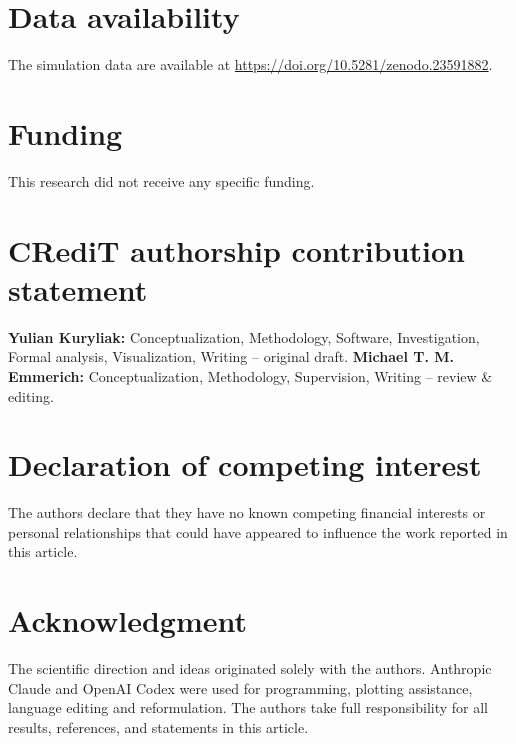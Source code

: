\documentclass{ieeeaccess}
\newcommand{\michael}[2]{{\color{RoyalBlue}#1}}
\begin{document}
\section*{Data availability}
\michael{The simulation data are available at
\url{https://doi.org/10.5281/zenodo.23591882}.}{The data is available at
\url{10.5281/zenodo.23591882}.}

\section*{Funding}
This research did not receive any specific funding.

\section*{CRediT authorship contribution statement}

\textbf{Yulian Kuryliak:} Conceptualization, Methodology, Software,
Investigation, Formal analysis, Visualization, Writing -- original draft.
\textbf{Michael T. M. Emmerich:} Conceptualization, Methodology, Supervision,
Writing -- review \& editing.

\section*{Declaration of competing interest}
The authors declare that they have no known competing financial interests or
personal relationships that could have appeared to influence the work reported
in this article.

\section*{Acknowledgment}
\michael{The scientific direction and ideas originated solely with the authors. Anthropic Claude and OpenAI Codex were used for programming, plotting assistance, language editing and reformulation. The authors take full responsibility for all results, references, and     statements in this article.}{During the preparation of this manuscript, the first author used OpenAI ChatGPT and Codex, and Anthropic Claude to assist with drafting, language editing, and structuring the manuscript across Sections I–VIII and Appendices A–C. These tools were also used interactively to discuss and refine mathematical arguments, support experimental design and statistical analysis, and assist with the development of simulation and analysis code.

The authors directed the research, made the final scientific and methodological decisions, and reviewed and approved the resulting manuscript.}
\end{document}
